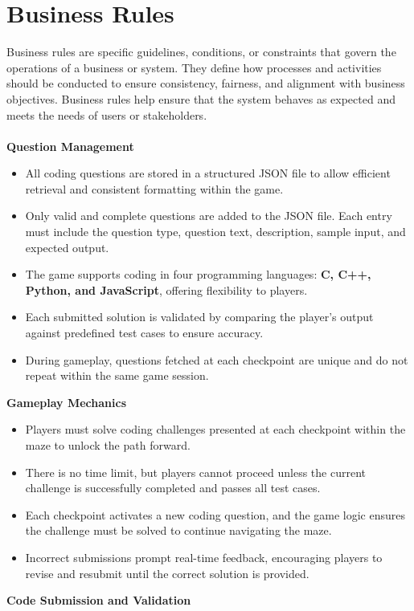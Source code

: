 \section{Business Rules}
Business rules are specific guidelines, conditions, or constraints that govern the operations of a
business or system. They define how processes and activities should be conducted to ensure
consistency, fairness, and alignment with business objectives. Business rules help ensure that the
system behaves as expected and meets the needs of users or stakeholders.\\\\
\textbf{Question Management}
\begin{itemize}
    \item All coding questions are stored in a structured JSON file to allow efficient retrieval and consistent formatting within the game.
    \item Only valid and complete questions are added to the JSON file. Each entry must include the question type, question text, description, sample input, and expected output.
    \item The game supports coding in four programming languages: \textbf{C, C++, Python, and JavaScript}, offering flexibility to players.
    \item Each submitted solution is validated by comparing the player's output against predefined test cases to ensure accuracy.
    \item During gameplay, questions fetched at each checkpoint are unique and do not repeat within the same game session.
\end{itemize}
\textbf{Gameplay Mechanics}
\begin{itemize}
    \item Players must solve coding challenges presented at each checkpoint within the maze to unlock the path forward.
    \item There is no time limit, but players cannot proceed unless the current challenge is successfully completed and passes all test cases.
    \item Each checkpoint activates a new coding question, and the game logic ensures the challenge must be solved to continue navigating the maze.
    \item Incorrect submissions prompt real-time feedback, encouraging players to revise and resubmit until the correct solution is provided.
\end{itemize}
\textbf{Code Submission and Validation}
